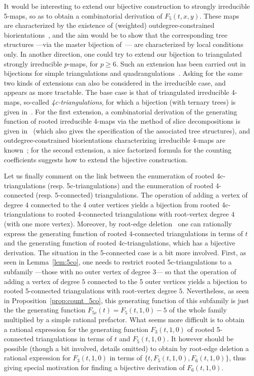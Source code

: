 \documentclass[letter]{amsart}
\numberwithin{theo}{section}
\theoremstyle{remark}
\def\Ffc{F_{5c}}
\begin{document}
It would be interesting to extend our bijective construction to strongly irreducible 5-maps, so as to obtain a combinatorial derivation of $F_5(t,x,y)$. These maps are characterized by the existence of (weighted) outdegree-constrained biorientations~\cite[Sec.12]{OB-EF-SL:Grand-Schnyder}, and the aim would be to show that the corresponding tree structures ---via the master bijection of~\cite{Bernardi-Fusy:dangulations}--- are characterized by local conditions only. 
 In another direction, one could try to extend our bijection to triangulated strongly irreducible $p$-maps, for $p\geq 6$. Such an extension has been carried out in bijections for simple triangulations and quadrangulations~\cite{albenque2013generic,Bernardi-Fusy:dangulations,PS06}.  
 Asking for the same two kinds of extensions can also be considered in the irreducible case, and appears as more tractable. The base case is that of triangulated irreducible 4-maps, so-called \emph{4c-triangulations}, for which a bijection (with ternary trees) is given in~\cite{Fu07b}. For the first extension, a combinatorial derivation of the generating function of rooted irreducible 4-maps via the method of slice decompositions is given in~\cite{BouttierG14} (which also gives the specification of the associated tree structures), and outdegree-constrained biorientations characterizing irreducible 4-maps are known~\cite[Sec.3.4]{OB-EF-SL:Grand-Schnyder}; for the second extension, a nice factorized formula for the counting coefficients suggests how to extend the bijective construction.          

Let us finally comment on the link between the enumeration of rooted 4c-triangulations (resp. 5c-triangulations) and the enumeration of rooted 4-connected (resp. 5-connected) triangulations.  
 The operation of adding a vertex of degree $4$ connected to the 4 outer vertices yields a bijection from rooted 4c-triangulations to rooted 4-connected triangulations with root-vertex degree $4$ (with one more vertex). Moreover, by root-edge deletion~\cite[Sec.4.3.2]{Fu07b} one can rationally express the generating function of rooted 4-connected triangulations in terms of $t$ and the generating function of rooted 4c-triangulations, which has a bijective derivation. The situation in the 5-connected case is a bit more involved. First, as seen in Lemma~\ref{lem:5co}, one needs to restrict rooted 5c-triangulations to a subfamily ---those with no outer vertex of degree $3$--- so that the operation of adding a vertex of degree $5$ connected to the 5 outer vertices yields a bijection to rooted 5-connected triangulations with root-vertex degree $5$. Nevertheless, as seen in Proposition~\ref{prop:count_5co}, this  generating function of this subfamily is just the the generating function $\Ffc(t)=F_5(t,1,0)-5$ of the whole family multiplied by a simple rational prefactor. What seems more difficult is to obtain a rational expression for the generating function $F_3(t,1,0)$ of rooted 5-connected triangulations in terms of $t$ and $F_5(t,1,0)$.  
 It however should be possible (though a bit involved, details omitted) to obtain by root-edge deletion a rational expression for $F_3(t,1,0)$ in terms of $\{t,F_5(t,1,0),F_6(t,1,0)\}$, thus giving special motivation for finding a bijective derivation of $F_6(t,1,0)$.  
\end{document}

